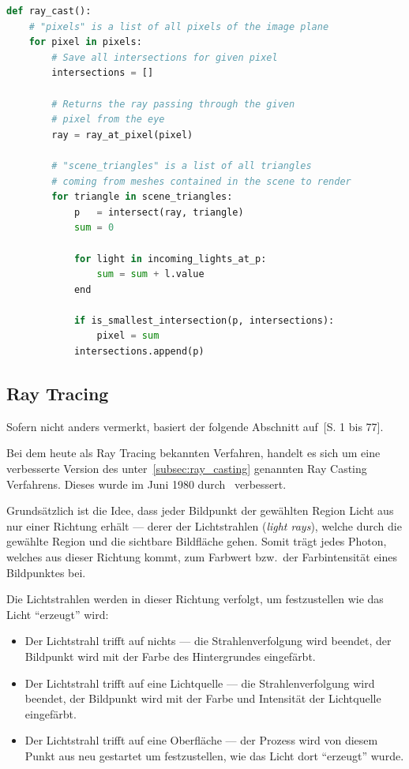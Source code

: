 \begin{lstlisting}[language=Python,caption={Eine abstrakte Umsetzung des Ray
        Castings\protect\footnotemark.},label={fig:ray_casting:high_level},captionpos=b,emph={ray_cast}]
def ray_cast():
    # "pixels" is a list of all pixels of the image plane
    for pixel in pixels:
        # Save all intersections for given pixel
        intersections = []

        # Returns the ray passing through the given
        # pixel from the eye
        ray = ray_at_pixel(pixel)

        # "scene_triangles" is a list of all triangles
        # coming from meshes contained in the scene to render
        for triangle in scene_triangles:
            p   = intersect(ray, triangle)
            sum = 0

            for light in incoming_lights_at_p:
                sum = sum + l.value
            end

            if is_smallest_intersection(p, intersections):
                pixel = sum
            intersections.append(p)
\end{lstlisting}

\subsection{Ray Tracing}
\label{subsec:ray_tracing}

Sofern nicht anders vermerkt, basiert der folgende Abschnitt
auf~\cite{glassner_introduction_1989}[S. 1 bis 77].

Bei dem heute als Ray Tracing bekannten Verfahren, handelt es sich um
eine verbesserte Version des unter~\ref{subsec:ray_casting} genannten
Ray Casting Verfahrens. Dieses wurde im Juni 1980
durch~\citeauthor{whitted_improved_1980} verbessert.

Grundsätzlich ist die Idee, dass jeder Bildpunkt der gewählten Region
Licht aus nur einer Richtung erhält --- derer der Lichtstrahlen
(\textit{light rays}), welche durch die gewählte Region und die
sichtbare Bildfläche gehen. Somit trägt jedes Photon, welches aus dieser
Richtung kommt, zum Farbwert bzw.\ der Farbintensität eines Bildpunktes
bei.

Die Lichtstrahlen werden in dieser Richtung verfolgt, um festzustellen
wie das Licht ``erzeugt'' wird:
\begin{itemize}
    \item{Der Lichtstrahl trifft auf nichts} --- die Strahlenverfolgung
        wird beendet, der Bildpunkt wird mit der Farbe des Hintergrundes
        eingefärbt.
    \item{Der Lichtstrahl trifft auf eine Lichtquelle} --- die
        Strahlenverfolgung wird beendet, der Bildpunkt wird mit der
        Farbe und Intensität der Lichtquelle eingefärbt.
    \item{Der Lichtstrahl trifft auf eine Oberfläche} --- der Prozess
        wird von diesem Punkt aus neu gestartet um festzustellen, wie
        das Licht dort ``erzeugt'' wurde.
\end{itemize}

